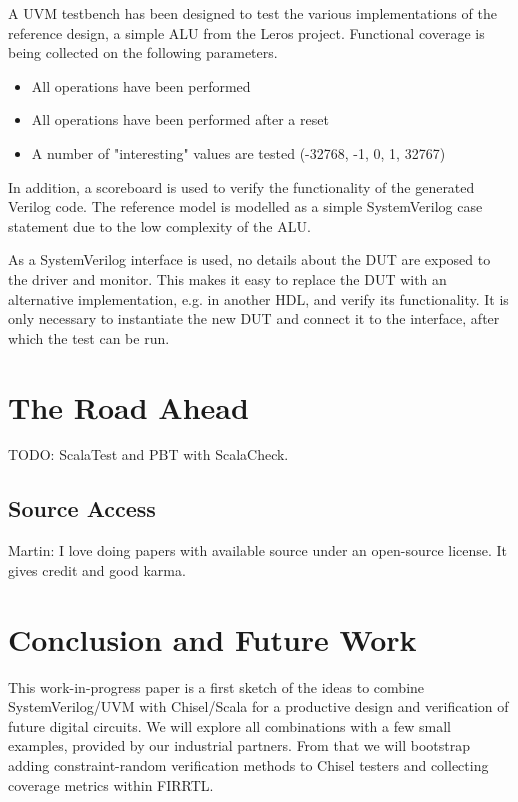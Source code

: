 \documentclass[a4paper, conference]{IEEEtran}
\newcommand{\todo}[1]{{\color{olive} TODO: #1}}
\newcommand{\martin}[1]{{\color{blue} Martin: #1}}
\begin{document}
A UVM testbench has been designed to test the various implementations of the reference design, a simple ALU from the Leros project. Functional coverage is being collected on the following parameters.
\begin{itemize}
    \item All operations have been performed
    \item All operations have been performed after a reset
    \item A number of "interesting" values are tested (-32768, -1, 0, 1, 32767)
\end{itemize}

In addition, a scoreboard is used to verify the functionality of the generated Verilog code. The reference model is modelled as a simple SystemVerilog case statement due to the low complexity of the ALU.

As a SystemVerilog interface is used, no details about the DUT are exposed to the driver and monitor. This makes it easy to replace the DUT with an alternative implementation, e.g. in another HDL, and verify its functionality. It is only necessary to instantiate the new DUT and connect it to the interface, after which the test can be run.

\section{The Road Ahead}

\todo{ScalaTest and PBT with ScalaCheck.}




\subsection{Source Access}

\martin{I love doing papers with available source under an
open-source license. It gives credit and good karma.}


\section{Conclusion and Future Work}
\label{sec:conclusion}

This work-in-progress paper is a first sketch of the ideas to combine SystemVerilog/UVM
with Chisel/Scala for a productive design and verification of future digital circuits.
We will explore all combinations with a few small examples, provided by our industrial
partners.
From that we will bootstrap adding constraint-random verification methods to Chisel
testers and collecting coverage metrics within FIRRTL.
\end{document}
